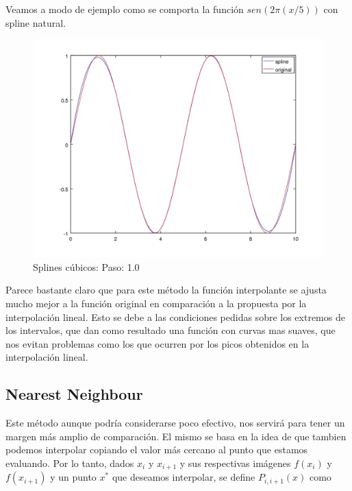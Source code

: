 Veamos a modo de ejemplo como se comporta la función $sen(2\pi(x/5))$ con spline natural.

\pagebreak

\begin{figure}[h]
\centering
  \begin{minipage}[b]{.9\textwidth}
    \includegraphics[width=\textwidth]{complementos/spline_1.jpg}
    \caption{Splines cúbicos: Paso: 1.0}
  \end{minipage}
\end{figure}

Parece bastante claro que para este método la función interpolante se ajusta mucho mejor a la función original en comparación a la propuesta por la interpolación lineal. Esto se debe a las condiciones pedidas sobre los extremos de los intervalos, que dan como resultado una función con curvas mas suaves, que nos evitan problemas como los que ocurren por los picos obtenidos en la interpolación lineal. 

\subsection{Nearest Neighbour}

Este método aunque podría considerarse poco efectivo, nos servirá para tener un margen más amplio de comparación. El mismo se basa en la idea de que tambien podemos interpolar copiando el valor más cercano al punto que estamos evaluando. 
Por lo tanto, dados $x_i$ y $x_{i+1}$ y sus respectivas imágenes $f(x_i)$ y $f(x_{i+1})$ y un punto $x^*$ que deseamos interpolar, se define $P_{i, i+1}(x)$ como
 

